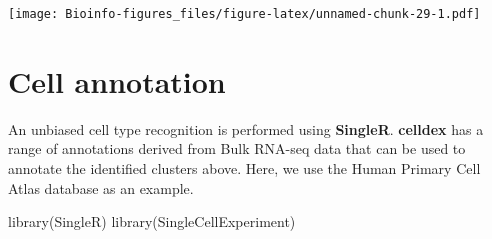 \documentclass[
  openany]{book}
\newenvironment{Shaded}{\begin{snugshade}}{\end{snugshade}}
\newcommand{\AttributeTok}[1]{\textcolor[rgb]{0.77,0.63,0.00}{#1}}
\newcommand{\ControlFlowTok}[1]{\textcolor[rgb]{0.13,0.29,0.53}{\textbf{#1}}}
\newcommand{\DecValTok}[1]{\textcolor[rgb]{0.00,0.00,0.81}{#1}}
\newcommand{\FunctionTok}[1]{\textcolor[rgb]{0.00,0.00,0.00}{#1}}
\newcommand{\NormalTok}[1]{#1}
\newcommand{\OtherTok}[1]{\textcolor[rgb]{0.56,0.35,0.01}{#1}}
\newcommand{\SpecialCharTok}[1]{\textcolor[rgb]{0.00,0.00,0.00}{#1}}
\newcommand{\StringTok}[1]{\textcolor[rgb]{0.31,0.60,0.02}{#1}}
\begin{document}
\begin{Shaded}
\end{Shaded}

\texttt{[image: Bioinfo-figures\_files/figure-latex/unnamed-chunk-29-1.pdf]}

\clearpage

\hypertarget{cell-annotation}{%
\section{Cell annotation}\label{cell-annotation}}

An unbiased cell type recognition is performed using \textbf{SingleR}. \textbf{celldex} has a range of annotations derived from Bulk RNA-seq data that can be used to annotate the identified clusters above. Here, we use the Human Primary Cell Atlas database as an example.

\begin{Shaded}
\begin{Highlighting}[]
\FunctionTok{library}\NormalTok{(SingleR)}
\FunctionTok{library}\NormalTok{(SingleCellExperiment)}
\end{Highlighting}
\end{Shaded}
\end{document}
